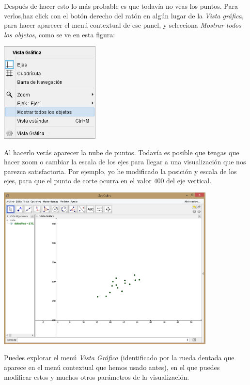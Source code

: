 \documentclass[10pt,a4paper]{article}\usepackage[]{graphicx}\usepackage[]{color}
\newcounter {cont01}
\begin{document}
Después de hacer esto lo más probable es que todavía no veas los puntos. Para verlos,haz click con el botón derecho del ratón en algún lugar de la {\em Vista gráfica}, para hacer aparecer el menú contextual de ese panel, y selecciona {\em Mostrar todos los objetos}, como se ve en esta figura:
\begin{center}
    \includegraphics[width=5cm]{../fig/Tut10-13.png}
\end{center}
Al hacerlo verás aparecer la nube de puntos. Todavía es posible que tengas que hacer zoom o cambiar la escala de los ejes para llegar a una visualización que nos parezca satisfactoria. Por ejemplo, yo he modificado la posición y escala de los ejes, para que el punto de corte ocurra en el valor $400$ del eje vertical.
\begin{center}
    \includegraphics[width=11cm]{../fig/Tut10-14.png}
\end{center}
Puedes explorar el menú {\em Vista Gráfica} (identificado por la rueda dentada que aparece en el menú contextual que hemos usado antes), en el que puedes modificar estos y muchos otros parámetros de la visualización.
\end{document}
